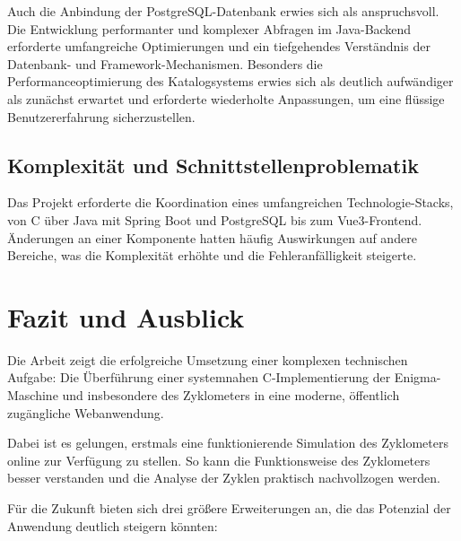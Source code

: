 \documentclass[12pt, ngerman, a4paper, numbers=noenddot]{article}
\begin{document}
Auch die Anbindung der PostgreSQL-Datenbank erwies sich als anspruchsvoll. Die Entwicklung performanter und komplexer Abfragen im Java-Backend erforderte umfangreiche Optimierungen und ein tiefgehendes Verständnis der Datenbank- und Framework-Mechanismen. Besonders die Performanceoptimierung des Katalogsystems erwies sich als deutlich aufwändiger als zunächst erwartet und erforderte wiederholte Anpassungen, um eine flüssige Benutzererfahrung sicherzustellen.


\subsection{Komplexität und Schnittstellenproblematik}

Das Projekt erforderte die Koordination eines umfangreichen Technologie-Stacks, von C über Java mit Spring Boot und PostgreSQL bis zum Vue3-Frontend. Änderungen an einer Komponente hatten häufig Auswirkungen auf andere Bereiche, was die Komplexität erhöhte und die Fehleranfälligkeit steigerte.


\newpage
\section{Fazit und Ausblick}

Die Arbeit zeigt die erfolgreiche Umsetzung einer komplexen technischen Aufgabe: Die Überführung einer systemnahen C\hyp{}Implementierung der Enigma-Maschine und insbesondere des Zyklometers in eine moderne, öffentlich zugängliche Webanwendung.

Dabei ist es gelungen, erstmals eine funktionierende Simulation des Zyklometers online zur Verfügung zu stellen. So kann die Funktionsweise des Zyklometers besser verstanden und die Analyse der Zyklen praktisch nachvollzogen werden.

Für die Zukunft bieten sich drei größere Erweiterungen an, die das Potenzial der Anwendung deutlich steigern könnten:
\end{document}
